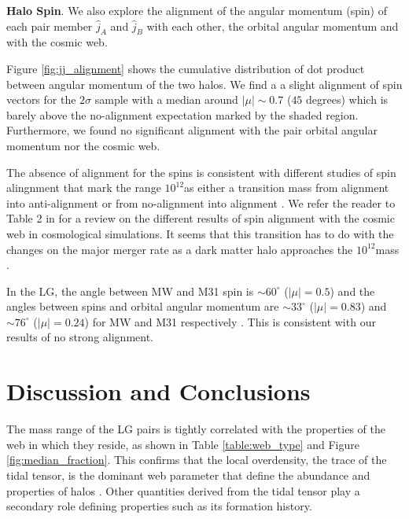 \documentclass{emulateapj}
\newcommand{\Msun}{{\ifmmode{{\rm {M_{\odot}}}}\else{${\rm{M_{\odot}}}$}\fi}}
\begin{document}
{\bf Halo Spin}. We also explore the alignment of the  angular
momentum (spin) of each pair member $\hat{j}_A$ and $\hat{j}_B$ with
each other, the orbital angular momentum and with the cosmic web. 

Figure \ref{fig:jj_alignment} shows the cumulative distribution of dot
product between angular momentum of the  two halos. We find a a slight
alignment of spin vectors for the $2\sigma$ sample with a median around
$|\mu|\sim 0.7$ ($45$ degrees) which is barely above the no-alignment expectation marked by the shaded region. Furthermore, we found no significant
alignment with the pair orbital angular momentum nor the cosmic web. 

The absence of alignment for the spins is consistent with different studies of
spin alingnment that mark the range $10^{12}$\Msun as either a transition mass
from alignment into anti-alignment or from no-alignment into alignment
\citep{Hahn2007,AragonCalvo2007,Zhang2009,Codis2012,Trowland2013,Libeskind2013,ForeroRomero2014}. We refer the reader to Table 2 in \cite{ForeroRomero2014}
for a review on the different results of spin alignment with the
cosmic web in cosmological simulations. It seems that this transition
has to do with the changes on the major merger rate as a dark matter
halo approaches the $10^{12}$\Msun mass \citep{2009MNRAS.399..762F,Codis2012}. 


 
In the LG, the angle between MW and M31 spin is $\sim60^{\circ}$
($|\mu|=0.5$) and the angles between spins and orbital angular
momentum are $\sim33^{\circ}$ ($|\mu|=0.83$) and $\sim76^{\circ}$
($|\mu|=0.24$) for MW and M31 respectively
\citep{2012ApJ...753....9V}. 
This is consistent with our results of no strong alignment.

\section{Discussion and Conclusions}
\label{sec:discussion}

The mass range of the LG pairs is tightly correlated with the
properties of the web in which they reside, as shown in Table
\ref{table:web_type} and Figure \ref{fig:median_fraction}. This
confirms that the local overdensity, the trace of the tidal tensor,
is the dominant web parameter that define the abundance and properties
of halos 
\citep{1998ApJ...500...14L,1999MNRAS.302..111L,2004MNRAS.350.1385S,2009MNRAS.394.1825F,
  Alonso2014}. Other
quantities derived from the tidal tensor play a secondary role
defining properties such as its formation history. 
\end{document}
